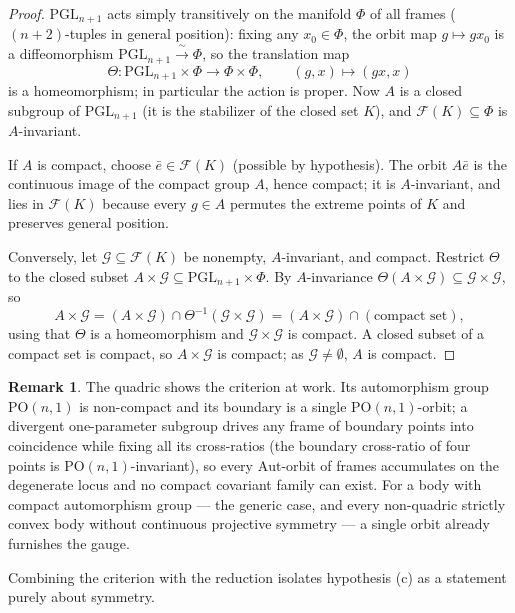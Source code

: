 \documentclass[11pt]{amsart}
\theoremstyle{definition}
\newtheorem{remark}[theorem]{Remark}
\newcommand{\PGL}{\mathrm{PGL}}
\begin{document}
\begin{proof}
$\PGL_{n+1}$ acts simply transitively on the manifold $\Phi$ of all frames
($(n+2)$-tuples in general position): fixing any $x_0\in\Phi$, the orbit map
$g\mapsto gx_0$ is a diffeomorphism $\PGL_{n+1}\xrightarrow{\ \sim\ }\Phi$, so
the translation map
\[
\Theta:\PGL_{n+1}\times\Phi\longrightarrow\Phi\times\Phi,\qquad
(g,x)\longmapsto(gx,x)
\]
is a homeomorphism; in particular the action is proper. Now $A$ is a closed
subgroup of $\PGL_{n+1}$ (it is the stabilizer of the closed set $K$), and
$\mathcal F(K)\subseteq\Phi$ is $A$-invariant.

If $A$ is compact, choose $\bar e\in\mathcal F(K)$ (possible by hypothesis).
The orbit $A\bar e$ is the continuous image of the compact group $A$, hence
compact; it is $A$-invariant, and lies in $\mathcal F(K)$ because every
$g\in A$ permutes the extreme points of $K$ and preserves general position.

Conversely, let $\mathcal G\subseteq\mathcal F(K)$ be nonempty, $A$-invariant,
and compact. Restrict $\Theta$ to the closed subset
$A\times\mathcal G\subseteq\PGL_{n+1}\times\Phi$. By $A$-invariance
$\Theta(A\times\mathcal G)\subseteq\mathcal G\times\mathcal G$, so
\[
A\times\mathcal G
=(A\times\mathcal G)\cap\Theta^{-1}(\mathcal G\times\mathcal G)
=(A\times\mathcal G)\cap(\text{compact set}),
\]
using that $\Theta$ is a homeomorphism and $\mathcal G\times\mathcal G$ is
compact. A closed subset of a compact set is compact, so $A\times\mathcal G$ is
compact; as $\mathcal G\ne\emptyset$, $A$ is compact.
\end{proof}

\begin{remark}
The quadric shows the criterion at work. Its automorphism group
$\mathrm{PO}(n,1)$ is non-compact and its boundary is a single
$\mathrm{PO}(n,1)$-orbit; a divergent one-parameter subgroup drives any frame
of boundary points into coincidence while fixing all its cross-ratios (the
boundary cross-ratio of four points is $\mathrm{PO}(n,1)$-invariant), so every
$\mathrm{Aut}$-orbit of frames accumulates on the degenerate locus and no
compact covariant family can exist. For a body with compact automorphism group
--- the generic case, and every non-quadric strictly convex body without
continuous projective symmetry --- a single orbit already furnishes the gauge.
\end{remark}

Combining the criterion with the reduction isolates hypothesis (c) as a
statement purely about symmetry.
\end{document}
